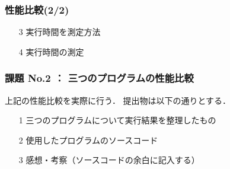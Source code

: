 \documentclass{beamer}                 %
\begin{document}
\begin{frame}
  \frametitle{性能比較(2/2)}
  \begin{enumerate}
  \item[3] 実行時間を測定方法
  \item[4] 実行時間の測定
  \end{enumerate}
\end{frame}

\begin{frame}[fragile]
\frametitle{課題 No.2 ： 三つのプログラムの性能比較}
上記の性能比較を実際に行う．
提出物は以下の通りとする．

\begin{enumerate}
\item[1] 三つのプログラムについて実行結果を整理したもの
\item[2] 使用したプログラムのソースコード
\item[3] 感想・考察（ソースコードの余白に記入する）
\end{enumerate}
\end{frame}

\end{document}
